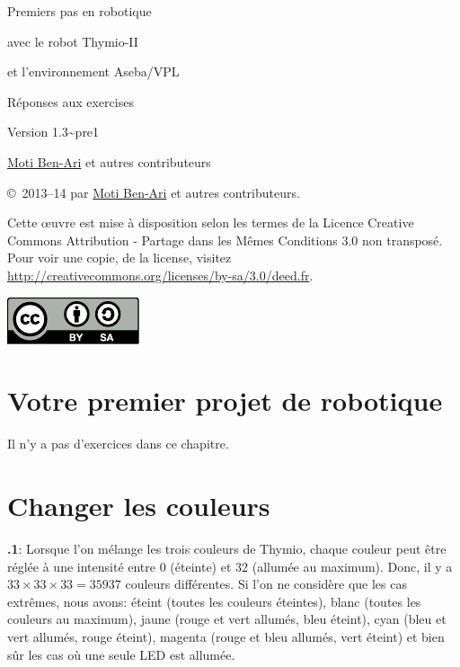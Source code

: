 \documentclass[12pt,a4paper,french]{article}
\begin{document}
\thispagestyle{empty}

\begin{center}
\begin{bfseries}

\begin{Large}
Premiers pas en robotique

avec le robot
Thymio-II

et l'environnement
Aseba/VPL

\bigskip

Réponses aux exercises

\end{Large}

Version 1.3{\textasciitilde}pre1

\bigskip

\href{http://www.weizmann.ac.il/sci-tea/benari/}{Moti Ben-Ari} et autres contributeurs

\end{bfseries}
\end{center}

\bigskip

\copyright{}\  2013--14 par \href{http://www.weizmann.ac.il/sci-tea/benari/}{Moti Ben-Ari} et autres contributeurs.

Cette œuvre est mise à disposition selon les termes de la Licence Creative Commons Attribution - Partage dans les Mêmes Conditions 3.0 non transposé.
Pour voir une copie, de la license, visitez \url{http://creativecommons.org/licenses/by-sa/3.0/deed.fr}.

\begin{center}
\hspace{6pt}\includegraphics[width=.2\textwidth]{../images/by-sa}
\end{center}


\section{Votre premier projet de robotique}

Il n'y a pas d'exercices dans ce chapitre.

\section{Changer les couleurs}

\textbf{\thesection.1}: 
Lorsque l'on mélange les trois couleurs de Thymio, chaque couleur peut être réglée à une intensité entre 0 (éteinte) et 32 (allumée au maximum). Donc, il y a $33 \times 33 \times 33=35 937$ couleurs différentes. Si l'on ne considère que les cas extrêmes, nous avons: éteint (toutes les couleurs éteintes), blanc (toutes les couleurs au maximum), jaune (rouge et vert allumés, bleu éteint), cyan (bleu et vert allumés, rouge éteint), magenta (rouge et bleu allumés, vert éteint) et bien sûr les cas où une seule LED est allumée.
\end{document}
